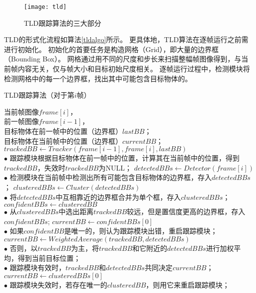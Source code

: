 \begin{figure}[htb]
  \centering
  \texttt{[image: tld]}
  \caption{TLD跟踪算法的三大部分}
  \label{tld}
\end{figure}

TLD的形式化流程如算法\ref{tldalgo}所示。
更具体地，TLD算法在逐帧运行之前需进行初始化。
初始化的首要任务是构造网格（Grid），即大量的边界框（Bounding Box）。
网格通过用不同的尺度和步长来扫描整幅帧图像得到，与当前帧内容无关，仅与帧大小和目标初始尺度相关。
逐帧运行过程中，检测模块将检测网格中的每一个边界框，找出其中可能包含目标物体的。


\begin{algorithm}[htbp]
  \caption{TLD跟踪算法（对于第$i$帧）}
  \label{tldalgo}
  \footnotesize
  \begin{algorithmic}[1]
    \REQUIRE $ $ \\ 当前帧图像$frame[i]$，\\ 前一帧图像$frame[i-1]$，\\ 目标物体在前一帧中的位置（边界框）$lastBB$；
    \ENSURE $ $ \\ 目标物体在当前帧中的位置（边界框）$currentBB$；
    \STATE $trackedBB \leftarrow Tracker( frame[i-1], frame[i], lastBB )$
    \\ $\bullet$ 跟踪模块根据目标物体在前一帧中的位置，计算其在当前帧中的位置，得到$trackedBB$，失效时$trackedBB$为NULL；
    \STATE $detectedBBs \leftarrow Detector( frame[i] )$
    \\ $\bullet$ 检测模块在当前帧中检测出所有可能包含目标物体的边界框，存入$detectedBBs$；
    \STATE $clusteredBBs \leftarrow Cluster( detectedBBs )$
    \\ $\bullet$ 将$detectedBBs$中互相靠近的边界框合并为单个框，存入$clusteredBBs$；
    	\STATE $confidentBBs \leftarrow clusteredBB$ 
    	\ENDIF
    \ENDFOR
    \\ $\bullet$ 从$clusteredBBs$中选出距离$trackedBB$较远，但是置信度更高的边界框，存入$confidentBBs$;
    \STATE $currentBB \leftarrow confidentBBs[0]$ 
    \\ $\bullet$ 如果$confidentBB$是唯一的，则认为跟踪模块出错，重启跟踪模块；
	\ELSE 
	\STATE $currentBB \leftarrow WeightedAverage( trackedBB, detectedBBs )$ 
	\\ $\bullet$ 否则，以$trackedBB$为主，将$trackedBB$和它附近的$detectedBBs$进行加权平均，得到当前目标位置；
    \ENDIF
    \\ $\bullet$ 跟踪模块有效时，$trackedBB$和$detectedBBs$共同决定$currentBB$；
\ELSE
	\STATE $currentBB \leftarrow clusteredBBs[0]$
	\ENDIF
	\\ $\bullet$ 跟踪模块失效时，若存在唯一的$clusteredBB$，则用它来重启跟踪模块；
\ENDIF


\end{algorithmic}
\end{algorithm}
